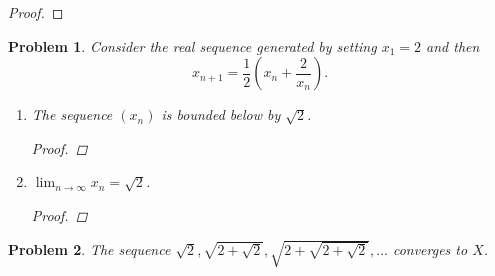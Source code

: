 \documentclass[12pt]{article}
\newtheorem{problem}{Problem}
\begin{document}
\begin{proof}
\end{proof}


\begin{problem} %
Consider the real sequence generated by setting $x_1=2$ and then
	$$x_{n+1} = \frac{1}{2}\left(x_n + \frac{2}{x_n}\right).$$

%

\renewcommand{\labelenumi}{(\alph{enumi})}
\begin{enumerate}
\item The sequence $(x_n)$ is bounded below by $\sqrt{2}$.

\begin{proof}
\end{proof}

\item $\lim_{n\to\infty} x_n = \sqrt{2}$.

\begin{proof}
\end{proof}

\end{enumerate}
\end{problem}


\begin{problem} %
The sequence $\displaystyle \sqrt{2}, \sqrt{2+\sqrt{2}}, \sqrt{2 + \sqrt{2+\sqrt{2}}}, \dots$ converges to $X$.
\end{problem}

\end{document}
